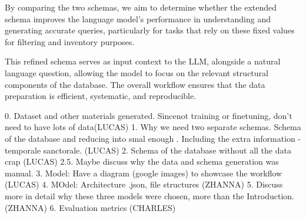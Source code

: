 By comparing the two schemas, we aim to determine whether the extended schema improves the language model's performance in understanding and generating accurate queries, particularly for tasks that rely on these fixed values for filtering and inventory purposes.

This refined schema serves as input context to the LLM, alongside a natural language question, allowing the model to focus on the relevant structural components of the database. The overall workflow ensures that the data preparation is efficient, systematic, and reproducible.



0. Dataset and other materials generated. Sincenot training or finetuning, don't need to have lots of data(LUCAS)
1. Why we need two separate schemas. Schema of the database and reducing into smal enough . Including the extra information - temporale sanctorale. (LUCAS)
2. Schema of the database without all the data crap (LUCAS)
2.5. Maybe discuss why the data and schema generation was manual.
3. Model: Have a diagram (google images) to showcase the workflow (LUCAS)
4. MOdel: Architecture .json, file structures (ZHANNA)
5. Discuss more in detail why these three models were chosen, more than the Introduction. (ZHANNA)
6. Evaluation metrics (CHARLES)
